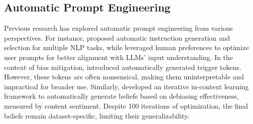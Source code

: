 \subsection{Automatic Prompt Engineering}
Previous research has explored automatic prompt engineering from various perspectives. For instance, \citet{zhou2022large} proposed automatic instruction generation and selection for multiple NLP tasks, while \citet{cheng2023black} leveraged human preferences to optimize user prompts for better alignment with LLMs' input understanding.
In the context of bias mitigation, \citet{sheng2020towards} introduced automatically generated trigger tokens. However, these tokens are often nonsensical, making them uninterpretable and impractical for broader use. Similarly, \citet{bauer2024believe} developed an iterative in-context learning framework to automatically generate beliefs based on debiasing effectiveness, measured by content sentiment. Despite 100 iterations of optimization, the final beliefs remain dataset-specific, limiting their generalizability.